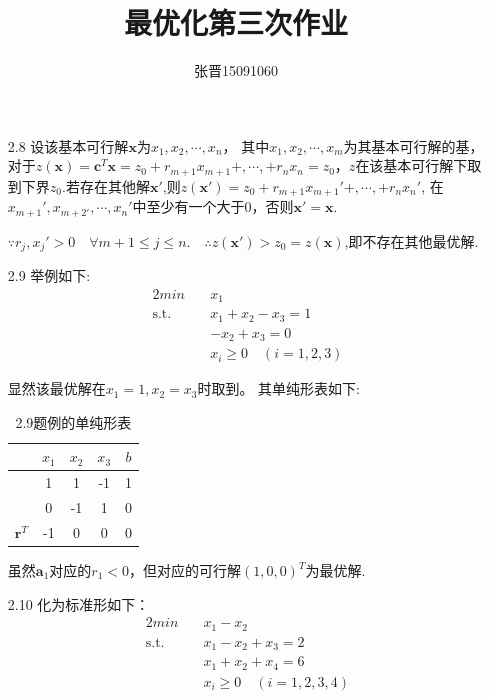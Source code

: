 \documentclass[UTF8]{ctexart}
\title{\heiti 最优化第三次作业}
\author{\kaishu 张晋15091060}
\begin{document}
\maketitle
\begin{enumerate}
\item[2.8] 设该基本可行解$\bm{x}$为$x_1,x_2,\cdots,x_n$，
其中$x_1,x_2,\cdots,x_m$为其基本可行解的基，对于$z(\bm{x})=\bm{c}^T\bm{x}=z_0+r_{m+1}x_{m+1}+,\cdots,+r_nx_n=z_0$，$z$在该基本可行解下取到下界$z_0$.若存在其他解$\bm{x}'$,则$z(\bm{x}')=z_0+r_{m+1}x_{m+1}'+,\cdots,+r_nx_n'$,
在$x_{m+1}',x_{m+2'},\cdots,x_n'$中至少有一个大于0，否则$\bm{x}'=\bm{x}$.

$\because r_j,x_j'>0 \quad \forall m+1\leq j \leq n.\quad \therefore z(\bm{x}')>z_0=z(\bm{x})$,即不存在其他最优解.

\item[2.9] 举例如下:
\begin{alignat}{2}
min \quad & x_1 \nonumber\\
\mbox{s.t.}\quad
&x_1+x_2-x_3=1 \nonumber\\
&-x_2+x_3=0 \nonumber \\
&x_i\geq 0\quad(i=1,2,3)
\end{alignat}

显然该最优解在$x_1=1,x_2=x_3$时取到。
其单纯形表如下:
\begin{table}[H]
\centering
\caption{2.9题例的单纯形表}
	\begin{tabular}{ccccc}
	\toprule
	{}&$x_1$&$x_2$&$x_3$&$b$\\
	\midrule
	{}&1&1&-1&1\\
	{}&0&-1&1&0\\
	$\bm{r}^T$&-1&0&0&0\\
	\bottomrule
	\end{tabular}
\end{table}

虽然$\bm{a}_1$对应的$r_1<0$，但对应的可行解$(1,0,0)^T$为最优解.
\item[2.10] 化为标准形如下：
\begin{alignat}{2}
min \quad & x_1-x_2 \nonumber\\
\mbox{s.t.}\quad
&x_1-x_2+x_3=2 \nonumber\\
&x_1+x_2+x_4=6 \nonumber \\
&x_i\geq 0\quad(i=1,2,3,4)
\end{alignat}


\end{enumerate}
\end{document}
